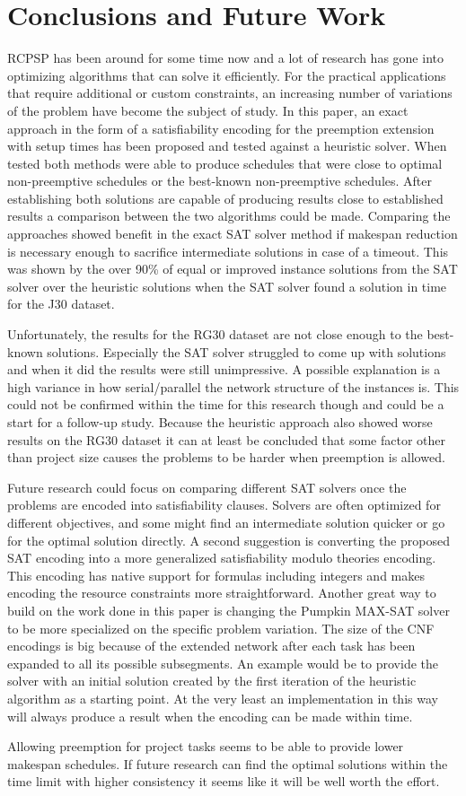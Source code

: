 \section{Conclusions and Future Work} \label{section:conclusion}
RCPSP has been around for some time now and a lot of research has gone into optimizing algorithms that can solve it efficiently. For the practical applications that require additional or custom constraints, an increasing number of variations of the problem have become the subject of study. In this paper, an exact approach in the form of a satisfiability encoding for the preemption extension with setup times has been proposed and tested against a heuristic solver. When tested both methods were able to produce schedules that were close to optimal non-preemptive schedules or the best-known non-preemptive schedules. After establishing both solutions are capable of producing results close to established results a comparison between the two algorithms could be made. Comparing the approaches showed benefit in the exact SAT solver method if makespan reduction is necessary enough to sacrifice intermediate solutions in case of a timeout. This was shown by the over 90\% of equal or improved instance solutions from the SAT solver over the heuristic solutions when the SAT solver found a solution in time for the J30 dataset.

Unfortunately, the results for the RG30 dataset are not close enough to the best-known solutions. Especially the SAT solver struggled to come up with solutions and when it did the results were still unimpressive. A possible explanation is a high variance in how serial/parallel the network structure of the instances is. This could not be confirmed within the time for this research though and could be a start for a follow-up study. Because the heuristic approach also showed worse results on the RG30 dataset it can at least be concluded that some factor other than project size causes the problems to be harder when preemption is allowed.

Future research could focus on comparing different SAT solvers once the problems are encoded into satisfiability clauses. Solvers are often optimized for different objectives, and some might find an intermediate solution quicker or go for the optimal solution directly. A second suggestion is converting the proposed SAT encoding into a more generalized satisfiability modulo theories encoding. This encoding has native support for formulas including integers and makes encoding the resource constraints more straightforward. Another great way to build on the work done in this paper is changing the Pumpkin MAX-SAT solver to be more specialized on the specific problem variation. The size of the CNF encodings is big because of the extended network after each task has been expanded to all its possible subsegments. An example would be to provide the solver with an initial solution created by the first iteration of the heuristic algorithm as a starting point. At the very least an implementation in this way will always produce a result when the encoding can be made within time.

Allowing preemption for project tasks seems to be able to provide lower makespan schedules. If future research can find the optimal solutions within the time limit with higher consistency it seems like it will be well worth the effort.